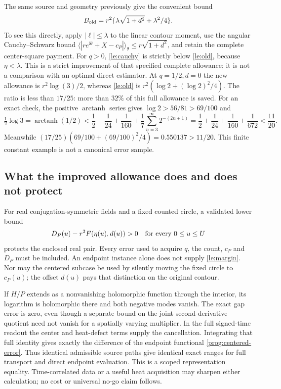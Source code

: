 The same source and geometry previously give the convenient bound
\begin{equation}
 B_{\rm old}=r^2\{\lambda\sqrt{1+d^2}+\lambda^2/4\}.
 \label{le:old}
\end{equation}
To see this directly, apply $|\ell|\le\lambda$ to the linear contour
moment, use the angular Cauchy--Schwarz bound
$\langle|re^{\ii\theta}+X-c_P|\rangle_\theta
\le r\sqrt{1+d^2}$, and retain the complete center-square payment.
For $q>0$, \eqref{le:cauchy} is strictly below \eqref{le:old}, because
$\eta<\lambda$. This is a strict improvement of that specified complete
allowance; it is not a comparison with an optimal direct estimator.
At $q=1/2,d=0$ the new allowance is $r^2\log(3)/2$, whereas
\eqref{le:old} is $r^2(\log2+(\log2)^2/4)$.
The ratio is less than $17/25$: more than $32\%$ of this full allowance
is saved. For an exact check, the positive $\operatorname{arctanh}$
series gives $\log2>56/81>69/100$ and
\[
 \tfrac12\log3
 =\operatorname{arctanh}(1/2)
 <\frac12+\frac1{24}+\frac1{160}
       +\frac1{7}\sum_{n=3}^{\infty}2^{-(2n+1)}
 =\frac12+\frac1{24}+\frac1{160}+\frac1{672}<\frac{11}{20}.
\]
Meanwhile $(17/25)(69/100+(69/100)^2/4)=0.550137>11/20$.
This finite constant example is not a canonical error sample.

\subsection{What the improved allowance does and does not protect}

For real conjugation-symmetric fields and a fixed counted circle, a
validated lower bound
\begin{equation}
 D_P(u)-r^2F(\eta(u),d(u))>0\quad\hbox{for every }0\le u\le U
 \label{le:margin}
\end{equation}
protects the enclosed real pair. Every error used to acquire $q$, the
count, $c_P$ and $D_P$ must be included. An endpoint instance alone
does not supply \eqref{le:margin}. Nor may the centered subcase be used
by silently moving the fixed circle to $c_P(u)$; the offset $d(u)$ pays
that distinction on the original contour.

If $H/P$ extends as a nonvanishing holomorphic function through the
interior, its logarithm is holomorphic there and both negative modes
vanish. The exact gap error is zero, even though a separate bound on the
joint second-derivative quotient need not vanish for a spatially varying
multiplier. In the full signed-time readout the center and heat-defect
terms supply the cancellation. Integrating that full identity gives
exactly the difference of the endpoint functional
\eqref{prog:centered-error}. Thus identical admissible source paths give
identical exact ranges for full transport and direct endpoint evaluation.
This is a scoped representation equality. Time-correlated data or a
useful heat acquisition may sharpen either calculation; no cost or
universal no-go claim follows.

